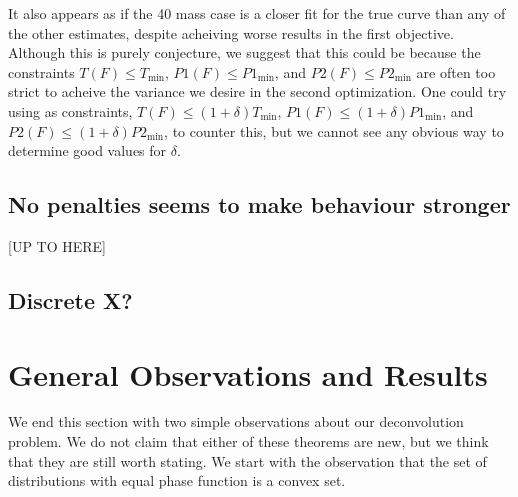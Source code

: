 It also appears as if the 40 mass case is a closer fit for the true curve than any of the other estimates, despite acheiving worse results in the first objective. Although this is purely conjecture, we suggest that this could be because the constraints $T(F) \leq T_\mathrm{min}$, $P1(F) \leq P1_\mathrm{min}$, and $P2(F) \leq P2_\mathrm{min}$ are often too strict to acheive the variance we desire in the second optimization. One could try using as constraints, $T(F) \leq (1 + \delta) T_\mathrm{min}$, $P1(F) \leq (1 + \delta) P1_\mathrm{min}$, and $P2(F) \leq (1 + \delta) P2_\mathrm{min}$, to counter this, but we cannot see any obvious way to determine good values for $\delta$.




\subsection{No penalties seems to make behaviour stronger}

[UP TO HERE]

\subsection{Discrete X?}

	

\section{General Observations and Results}
\label{sec:deconvolution observations and results}

We end this section with two simple observations about our deconvolution problem. We do not claim that either of these theorems are new, but we think that they are still worth stating.
We start with the observation that the set of distributions with equal phase function is a convex set.

